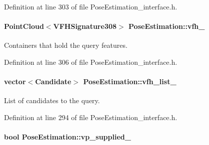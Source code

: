 Definition at line 303 of file Pose\-Estimation\-\_\-interface.\-h.

\hypertarget{classPoseEstimation_aa5b8629653546950dfc66147f3df29a7}{
\paragraph[{vfh\-\_\-}]{\setlength{\rightskip}{0pt plus 5cm}Point\-Cloud$<$V\-F\-H\-Signature308$>$ Pose\-Estimation\-::vfh\-\_\-\hspace{0.3cm}{\ttfamily [private]}}}\label{classPoseEstimation_aa5b8629653546950dfc66147f3df29a7}


Containers that hold the query features. 



Definition at line 306 of file Pose\-Estimation\-\_\-interface.\-h.

\hypertarget{classPoseEstimation_ac75bed8cd5eea4f58b3c68336801977a}{
\paragraph[{vfh\-\_\-list\-\_\-}]{\setlength{\rightskip}{0pt plus 5cm}vector$<${\bf Candidate}$>$ Pose\-Estimation\-::vfh\-\_\-list\-\_\-\hspace{0.3cm}{\ttfamily [private]}}}\label{classPoseEstimation_ac75bed8cd5eea4f58b3c68336801977a}


List of candidates to the query. 



Definition at line 294 of file Pose\-Estimation\-\_\-interface.\-h.

\hypertarget{classPoseEstimation_a1e1d26efa152cca49892e2458f0e5842}{
\paragraph[{vp\-\_\-supplied\-\_\-}]{\setlength{\rightskip}{0pt plus 5cm}bool Pose\-Estimation\-::vp\-\_\-supplied\-\_\-\hspace{0.3cm}{\ttfamily [private]}}}\label{classPoseEstimation_a1e1d26efa152cca49892e2458f0e5842}


